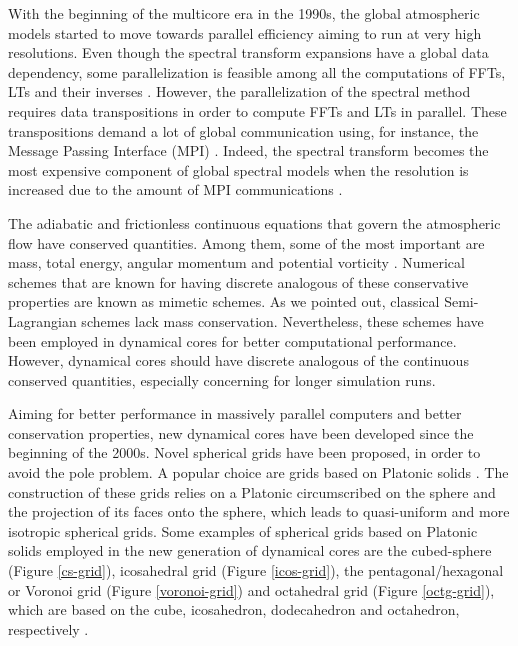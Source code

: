 With the beginning of the multicore era in the 1990s, the global atmospheric models
started to move towards parallel efficiency aiming to run at very high resolutions. 
Even though the spectral transform expansions have a global data dependency, some parallelization
is feasible among all the computations of FFTs, LTs and their inverses \citep{barros:1995}.
However, the parallelization of the spectral method requires data transpositions in order
to compute FFTs and LTs in parallel.  
These transpositions demand a lot of global communication using, for instance,
the Message Passing Interface (MPI) \citep{zheng:2018}. 
Indeed, the spectral transform becomes the most expensive component of global spectral models
when the resolution is increased due to the amount of MPI communications \citep{mueller:2019}.

The adiabatic and frictionless continuous equations that govern the atmospheric flow have 
conserved quantities. Among them, some of the most important are mass, total energy, 
angular momentum and potential vorticity \citep{thuburn:2011}.
Numerical schemes that are known for having discrete analogous of these conservative properties
are known as mimetic schemes.
As we pointed out, classical Semi-Lagrangian schemes lack mass conservation. Nevertheless, 
these schemes have been employed in dynamical cores for better computational performance.
However, dynamical cores should have discrete analogous of the 
continuous conserved quantities, especially concerning for longer simulation runs.

Aiming for better performance in massively parallel computers and better conservation properties, 
new dynamical cores have been developed since the beginning of the 2000s.
Novel spherical grids have been proposed, in order to avoid the pole problem.
A popular choice are grids based on Platonic solids \citep{stan:2012}.
The construction of these grids relies on a Platonic circumscribed on the sphere and 
the projection of its faces onto the sphere, which leads to quasi-uniform and more isotropic
spherical grids.
Some examples of spherical grids based on Platonic solids employed in the new generation
of dynamical cores are the cubed-sphere (Figure \ref{cs-grid}), icosahedral grid (Figure \ref{icos-grid}), 
the pentagonal/hexagonal or Voronoi grid (Figure \ref{voronoi-grid}) and octahedral grid (Figure \ref{octg-grid}),
which are based on the cube, icosahedron, dodecahedron and octahedron, respectively \citep{ullrich:2017}.

